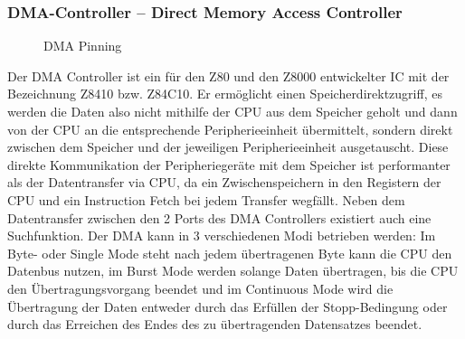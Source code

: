 \subsubsection{DMA-Controller -- Direct Memory Access Controller}
\begin{figure}[H]
    \qquad
    \qquad
    \caption[Z80 DMA Pinning]{DMA Pinning \cite{z80:dma}}
    \label{fig:z80-dma-pinning}
\end{figure}

Der DMA Controller ist ein für den Z80 und den Z8000 entwickelter IC mit der Bezeichnung Z8410 bzw. Z84C10. Er ermöglicht einen Speicherdirektzugriff, es werden die Daten also nicht mithilfe der CPU aus dem Speicher geholt und dann von der CPU an die entsprechende Peripherieeinheit übermittelt, sondern direkt zwischen dem Speicher und der jeweiligen Peripherieeinheit ausgetauscht. Diese direkte Kommunikation der Peripheriegeräte mit dem Speicher ist performanter als der Datentransfer via CPU, da ein Zwischenspeichern in den Registern der CPU und ein Instruction Fetch bei jedem Transfer wegfällt. Neben dem Datentransfer zwischen den 2 Ports des DMA Controllers existiert auch eine Suchfunktion. Der DMA kann in 3 verschiedenen Modi betrieben werden: Im Byte- oder Single Mode steht nach jedem übertragenen Byte kann die CPU den Datenbus nutzen, im Burst Mode werden solange Daten übertragen, bis die CPU den Übertragungsvorgang beendet und im Continuous Mode wird die Übertragung der Daten entweder durch das Erfüllen der Stopp-Bedingung oder durch das Erreichen des Endes des zu übertragenden Datensatzes beendet.

